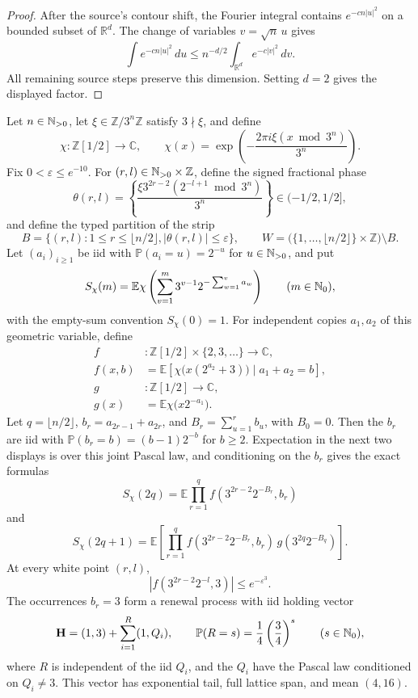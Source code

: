 \begin{proof}
After the source's contour shift, the Fourier integral contains
\(e^{-cn|u|^2}\) on a bounded subset of \(\mathbb R^d\).  The change of
variables \(v=\sqrt n\,u\) gives
\[
 \int e^{-cn|u|^2}\,du
 \le n^{-d/2}\int_{\mathbb R^d}e^{-c|v|^2}\,dv.
\]
All remaining source steps preserve this dimension.  Setting \(d=2\)
gives the displayed factor.
\end{proof}

\begin{proposition}
\label{prop:Tao-v7-pairing-holding}
Let \(n\in\mathbb{N}_{>0}\), let
\(\xi\in\mathbb Z/3^n\mathbb Z\) satisfy \(3\nmid\xi\), and define
\[
 \chi:\mathbb Z[1/2]\longrightarrow\mathbb C,\qquad
 \chi(x)=\exp\left(-\frac{2\pi i\xi(x\bmod3^n)}{3^n}\right).
\]
Fix \(0<\varepsilon\le e^{-10}\).  For
\((r,l)\in\mathbb{N}_{>0}\times\mathbb Z\), define the
signed fractional phase
\[
 \theta(r,l)=\left\{
 \frac{\xi3^{2r-2}(2^{-l+1}\bmod3^n)}{3^n}
 \right\}\in(-1/2,1/2],
\]
and define the typed partition of the strip
\[
 B=\{(r,l):1\le r\le\lfloor n/2\rfloor,
                  |\theta(r,l)|\le\varepsilon\},\qquad
 W=\bigl(\{1,\ldots,\lfloor n/2\rfloor\}\times\mathbb Z\bigr)\setminus B.
\]
Let \((a_i)_{i\ge1}\) be iid with
\(\mathbb P(a_i=u)=2^{-u}\) for \(u\in\mathbb{N}_{>0}\), and put
\[
 S_\chi(m)=\mathbb E\chi\left(
 \sum_{v=1}^{m}3^{v-1}2^{-\sum_{w=1}^{v}a_w}
 \right)\qquad(m\in\mathbb{N}_{0}),
\]
with the empty-sum convention \(S_\chi(0)=1\).
For independent copies \(a_1,a_2\) of this geometric variable, define
\[
 \begin{aligned}
 f&:\mathbb Z[1/2]\times\{2,3,\ldots\}\longrightarrow\mathbb C,\\
 f(x,b)&=\mathbb E\!\left[
 \chi\bigl(x(2^{a_2}+3)\bigr)\mid a_1+a_2=b\right],\\
 g&:\mathbb Z[1/2]\longrightarrow\mathbb C,\\
 g(x)&=\mathbb E\chi\bigl(x2^{-a_1}\bigr).
 \end{aligned}
\]
Let \(q=\lfloor n/2\rfloor\),
\(b_r=a_{2r-1}+a_{2r}\), and
\(B_r=\sum_{u=1}^rb_u\), with \(B_0=0\).  Then the \(b_r\) are iid with
\(\mathbb P(b_r=b)=(b-1)2^{-b}\) for \(b\ge2\).  Expectation in the next
two displays is over this joint Pascal law, and conditioning on the
\(b_r\) gives the exact formulas
\[
 S_\chi(2q)=\mathbb E
 \prod_{r=1}^qf(3^{2r-2}2^{-B_r},b_r)
\]
and
\[
 S_\chi(2q+1)=\mathbb E\left[
 \prod_{r=1}^qf(3^{2r-2}2^{-B_r},b_r)\,
 g(3^{2q}2^{-B_q})\right].
\]
At every white point \((r,l)\),
\[
 |f(3^{2r-2}2^{-l},3)|\le e^{-\varepsilon^3}.
\]
The occurrences \(b_r=3\) form a renewal process with iid holding vector
\[
 \mathbf H=(1,3)+\sum_{i=1}^{R}(1,Q_i),
 \qquad
 \mathbb P(R=s)=\frac14\left(\frac34\right)^s
 \qquad(s\in\mathbb{N}_{0}),
\]
where \(R\) is independent of the iid \(Q_i\), and the \(Q_i\) have the
Pascal law conditioned on \(Q_i\ne3\).  This vector
has exponential tail, full lattice span, and mean \((4,16)\).
\end{proposition}

